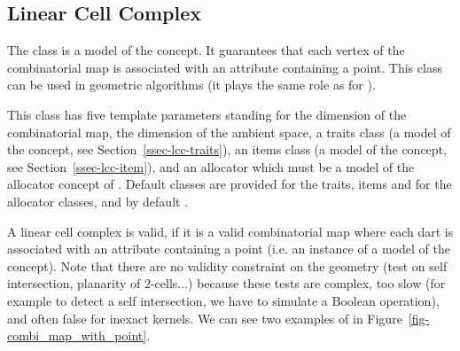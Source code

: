 \subsection{Linear Cell Complex}\label{ssec-linear-cell-complex}

The  class
is a model of the  concept. It guarantees that
each vertex of the combinatorial map is associated with an attribute
containing a point. This class can be used in geometric algorithms (it
plays the same role as  for ).

This class has five template parameters standing for the dimension of
the combinatorial map, the dimension of the ambient space, a traits
class (a model of the  concept, see
Section~\ref{ssec-lcc-traits}), an items class (a model of the
 concept, see
Section~\ref{ssec-lcc-item}), and an allocator which must be a model
of the allocator concept of {\stl}.  Default classes are provided for
the traits, items and for the allocator classes, and by default
.

A linear cell complex is valid, if it is a valid combinatorial map
where each dart is associated with an attribute containing a point
(i.e.  an instance of a model of the 
concept).  Note that there are no validity constraint on the geometry
(test on self intersection, planarity of 2-cells...) because these
tests are complex, too slow (for example to detect a self
intersection, we have to simulate a Boolean operation), and often
false for inexact kernels.  We can see two examples of
 in
Figure~\ref{fig-combi_map_with_point}.

